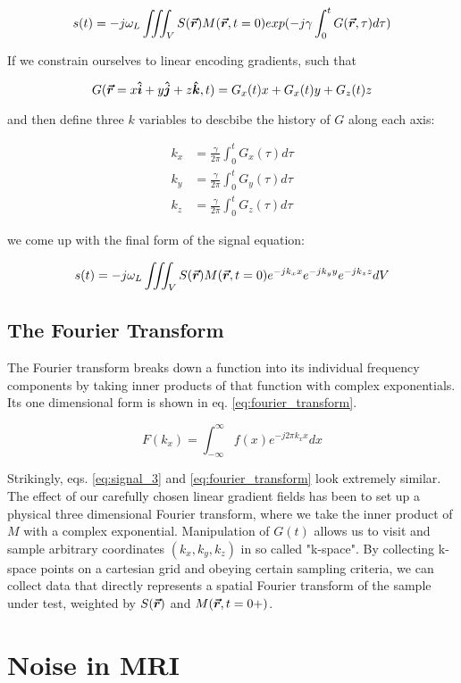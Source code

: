 \begin{equation}\label{signal_2}
    s(t) = - j \omega_L \iiint_V S(\bm{\vec{r}}) M(\bm{\vec{r}},t=0) exp(-j \gamma \int_0^t G(\bm{\vec{r}},\tau)
    d\tau)
\end{equation}

If we constrain ourselves to linear encoding gradients, such that

\begin{equation}\label{linear_gradient}
    G(\bm{\vec{r}}=x\bm{\hat{i}} + y\bm{\hat{j}} + z\bm{\hat{k}},t) = G_x(t) x + G_x(t) y + G_z(t) z 
\end{equation}

and then define three $k$ variables to descbibe the history of $G$ along each axis:

\begin{equation}\label{k_space}
    \begin{aligned}
        k_x &= \frac{\gamma}{2\pi} \int_0^t G_x(\tau) d\tau\\
        k_y &= \frac{\gamma}{2\pi} \int_0^t G_y(\tau) d\tau\\
        k_z &= \frac{\gamma}{2\pi} \int_0^t G_z(\tau) d\tau
    \end{aligned}
\end{equation}

we come up with the final form of the signal equation:

\begin{equation}\label{eq:signal_3}
    s(t) = - j \omega_L \iiint_V S(\bm{\vec{r}}) M(\bm{\vec{r}},t=0) e^{-j k_x x} e^{-j k_y y} e^{-j k_z z} dV 
\end{equation}

\subsection{The Fourier Transform}
The Fourier transform breaks down a function into its individual frequency components by taking inner products of that
function with complex exponentials. Its one dimensional form is shown in eq. \ref{eq:fourier_transform}.

\begin{equation}\label{eq:fourier_transform}
    F(k_x) = \int_{-\infty}^{\infty} f(x)e^{-j2\pi k_x x} dx
\end{equation}

Strikingly, eqs. \ref{eq:signal_3} and \ref{eq:fourier_transform} look extremely similar. The effect of our carefully
chosen linear gradient fields has been to set up a physical three dimensional Fourier transform, where we take the inner
product of $M$ with a complex exponential. Manipulation of $G(t)$ allows us to visit and sample arbitrary coordinates $(k_x,k_y,k_z)$
in so called "k-space".  By collecting k-space points on a cartesian grid and obeying certain sampling criteria, we can
collect data that directly represents a spatial Fourier transform of the sample under test, weighted by $S(\bm{\vec{r}})$
and $M(\bm{\vec{r}},t=0+)$.



\section{Noise in MRI}
